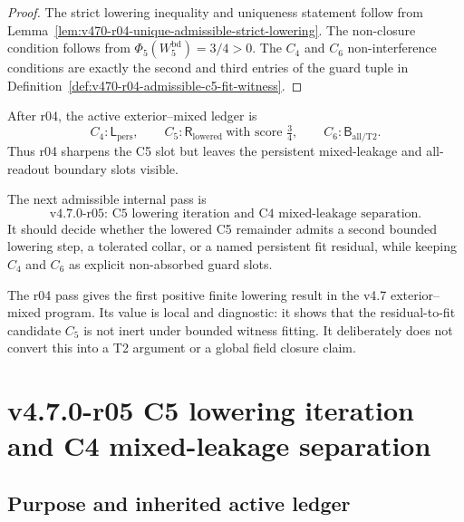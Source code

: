 \begin{proof}
The strict lowering inequality and uniqueness statement follow from
Lemma~\ref{lem:v470-r04-unique-admissible-strict-lowering}.  The non-closure
condition follows from \(\Phi_5(W_5^{\mathrm{bd}})=3/4>0\).  The \(C_4\) and
\(C_6\) non-interference conditions are exactly the second and third entries of
the guard tuple in Definition~\ref{def:v470-r04-admissible-c5-fit-witness}.
\end{proof}

\begin{corollary}
\label{cor:v470-r04-active-residual-ledger}
After r04, the active exterior--mixed ledger is
\[
C_4:\mathsf L_{\mathrm{pers}},
\qquad
C_5:\mathsf R_{\mathrm{lowered}}\ \text{with score }\tfrac34,
\qquad
C_6:\mathsf B_{\mathrm{all/T2}}.
\]
Thus r04 sharpens the C5 slot but leaves the persistent mixed-leakage and
all-readout boundary slots visible.
\end{corollary}

\begin{corollary}
\label{cor:v470-r04-permitted-r05-direction}
The next admissible internal pass is
\[
\text{v4.7.0-r05: C5 lowering iteration and C4 mixed-leakage separation.}
\]
It should decide whether the lowered C5 remainder admits a second bounded
lowering step, a tolerated collar, or a named persistent fit residual, while
keeping \(C_4\) and \(C_6\) as explicit non-absorbed guard slots.
\end{corollary}

\begin{remark}[r04 summary]
The r04 pass gives the first positive finite lowering result in the v4.7
exterior--mixed program.  Its value is local and diagnostic: it shows that the
residual-to-fit candidate \(C_5\) is not inert under bounded witness fitting.
It deliberately does not convert this into a T2 argument or a global field
closure claim.
\end{remark}



\clearpage
\section{v4.7.0-r05 C5 lowering iteration and C4 mixed-leakage separation}
\label{sec:v470-r05-c5-lowering-iteration-c4-separation}

\subsection{Purpose and inherited active ledger}
\label{subsec:v470-r05-purpose-ledger}

